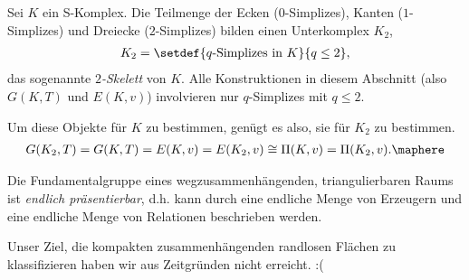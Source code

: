 \begin{bemn}[Beobachtung.]
Sei $K$ ein S-Komplex. Die Teilmenge der Ecken ($0$-Simplizes), Kanten
($1$-Simplizes) und Dreiecke ($2$-Simplizes) bilden einen Unterkomplex $K_2$,
\begin{align*}
K_2 = \setdef{q\text{-Simplizes in }K}{q\le 2},
\end{align*}
das sogenannte \emph{$2$-Skelett} von $K$. Alle Konstruktionen in diesem
Abschnitt (also $G(K,T)$ und $E(K,v)$) involvieren nur $q$-Simplizes mit $q\le
2$.

Um diese Objekte für $K$ zu bestimmen, genügt es also, sie für $K_2$ zu
bestimmen.
\begin{align*}
G(K_2,T) = G(K,T) = E(K,v) = E(K_2,v) \cong \Pi(K,v) = \Pi(K_2,v).\maphere 
\end{align*}
\end{bemn}

\begin{cor}
\label{prop:4.2.12}
Die Fundamentalgruppe eines wegzusammenhängenden, triangulierbaren Raums ist
\emph{endlich präsentierbar}, d.h. kann durch eine endliche Menge von Erzeugern
und eine endliche Menge von Relationen beschrieben werden.\fishhere
\end{cor}

Unser Ziel, die kompakten zusammenhängenden randlosen Flächen zu klassifizieren
haben wir aus Zeitgründen nicht erreicht. :(